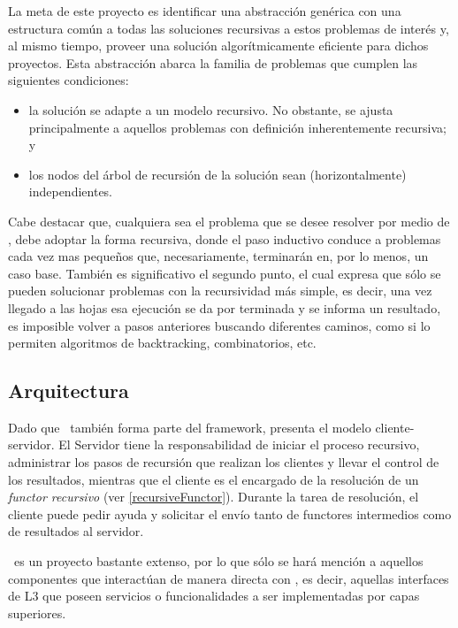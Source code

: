       La meta de este proyecto es identificar una abstracci\'on gen\'erica con una estructura com\'un a todas las soluciones recursivas a estos
      problemas de inter\'es y, al mismo tiempo, proveer una soluci\'on algor\'itmicamente eficiente para dichos proyectos. Esta abstracci\'on abarca
      la familia de problemas que cumplen las siguientes condiciones:

      \begin{itemize}
        \item la soluci\'on se adapte a un modelo recursivo. No obstante, se ajusta principalmente a aquellos problemas con definici\'on 
          inherentemente recursiva; y 
        \item los nodos del \'arbol de recursi\'on de la soluci\'on sean (horizontalmente) independientes.
      \end{itemize}

      Cabe destacar que, cualquiera sea el problema que se desee resolver por medio de \recabs, debe adoptar la forma recursiva, donde el paso
      inductivo conduce a problemas cada vez mas peque\~nos que, necesariamente, terminar\'an en, por lo menos, un caso base. Tambi\'en es
      significativo el segundo punto, el cual expresa que s\'olo se pueden solucionar problemas con la recursividad m\'as simple, es decir, 
      una vez llegado a las hojas esa ejecuci\'on se da por terminada y se informa un resultado, es imposible volver a pasos anteriores buscando
      diferentes caminos, como si lo permiten algoritmos de backtracking, combinatorios, etc.
			
			\subsection{Arquitectura}
				Dado que \recabs \ tambi\'en forma parte del framework, presenta el modelo cliente-servidor. El Servidor tiene la responsabilidad de iniciar 
				el proceso recursivo, administrar los pasos de recursi\'on que realizan los clientes y llevar el control de los resultados, mientras que el 
        cliente es el encargado de la resoluci\'on de un \textit{functor recursivo} (ver \ref{recursiveFunctor}). Durante la tarea de resoluci\'on, 
        el cliente puede pedir ayuda y solicitar el env\'io tanto de functores intermedios como de resultados al servidor.
				
				\recabs \ es un proyecto bastante extenso, por lo que s\'olo se har\'a menci\'on a aquellos componentes que interact\'uan de manera directa con 
				\combeng, es decir, aquellas interfaces de L3 que poseen servicios o funcionalidades a ser implementadas por capas superiores.
				

